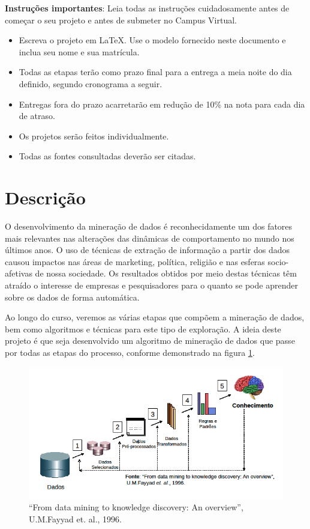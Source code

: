 \documentclass[a4 paper]{article}
\begin{document}

\textbf{Instruções importantes}: Leia todas as instruções cuidadosamente antes de começar o seu projeto e antes de submeter no Campus Virtual.
\begin{itemize}
    \item Escreva o projeto em \LaTeX. Use o modelo fornecido neste documento e inclua seu nome e sua matrícula. 
    \item Todas as etapas terão como prazo final para a entrega a meia noite do dia definido, segundo cronograma a seguir.
    \item Entregas fora do prazo acarretarão em redução de 10\% na nota para cada dia de atraso.
    \item Os projetos serão feitos individualmente.
    \item Todas as fontes consultadas deverão ser citadas.
\end{itemize}

\section*{Descrição}

O desenvolvimento da mineração de dados é reconhecidamente um dos fatores mais relevantes nas alterações das dinâmicas de comportamento no mundo nos últimos anos. O uso de técnicas de extração de informação a partir dos dados causou impactos nas áreas de marketing, política, religião e nas esferas socio-afetivas de nossa sociedade. Os resultados obtidos por meio destas técnicas têm atraído o interesse de empresas e pesquisadores para o quanto se pode aprender sobre os dados de forma automática.

Ao longo do curso, veremos as várias etapas que compõem a mineração de dados, bem como algoritmos e técnicas para este tipo de exploração. A ideia deste projeto é que seja desenvolvido um algoritmo de mineração de dados que passe por todas as etapas do processo, conforme demonstrado na figura \ref{figs:etapas}.

\begin{figure}[htb!]
    \centering
    \includegraphics[width=\textwidth]{imgs/etapas_md.png}
    \caption{``From data mining to knowledge discovery: An overview'', U.M.Fayyad et. al., 1996.}
    \label{figs:etapas}
\end{figure}
\end{document}
